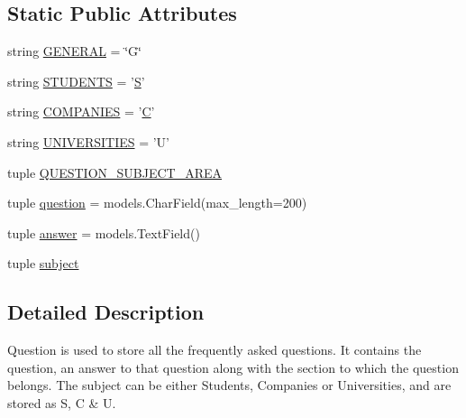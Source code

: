 \subsection*{Static Public Attributes}
\begin{DoxyCompactItemize}
\item 
string \hyperlink{classqueries_1_1models_1_1_f_a_question_a2f8e70ef9eefe790efcadd6f7aa6467b}{G\-E\-N\-E\-R\-A\-L} = \char`\"{}G\char`\"{}
\item 
string \hyperlink{classqueries_1_1models_1_1_f_a_question_a3af0be390dc5ab40ebbfd8121d89a389}{S\-T\-U\-D\-E\-N\-T\-S} = '\hyperlink{jquery-migrate-1_82_81_8min_8js_a8bab16140cede5f71c657e8dc46c1887}{S}'
\item 
string \hyperlink{classqueries_1_1models_1_1_f_a_question_ac8a38c591891ee425e8feecc74cd2678}{C\-O\-M\-P\-A\-N\-I\-E\-S} = '\hyperlink{jquery-migrate-1_82_81_8min_8js_ae59e0ac8d0c43c81f50236f719763efc}{C}'
\item 
string \hyperlink{classqueries_1_1models_1_1_f_a_question_a48154d9af078c02edb17e3c9ce2f92bc}{U\-N\-I\-V\-E\-R\-S\-I\-T\-I\-E\-S} = 'U'
\item 
tuple \hyperlink{classqueries_1_1models_1_1_f_a_question_acbc5516bb3f9ba326f3ff1893f7d446b}{Q\-U\-E\-S\-T\-I\-O\-N\-\_\-\-S\-U\-B\-J\-E\-C\-T\-\_\-\-A\-R\-E\-A}
\item 
tuple \hyperlink{classqueries_1_1models_1_1_f_a_question_aeb9a06018cf2c003de403276063c620e}{question} = models.\-Char\-Field(max\-\_\-length=200)
\item 
tuple \hyperlink{classqueries_1_1models_1_1_f_a_question_a993b5b7860c718d2912e5237cc6b8ed5}{answer} = models.\-Text\-Field()
\item 
tuple \hyperlink{classqueries_1_1models_1_1_f_a_question_a3936b3cdd958019959407233e529bea3}{subject}
\end{DoxyCompactItemize}


\subsection{Detailed Description}
\begin{DoxyVerb}Question is used to store all the frequently asked questions.
It contains the question, an answer to that question along with the section to which the question belongs.
The subject can be either Students, Companies or Universities, and are stored as S, C & U.
\end{DoxyVerb}
 

